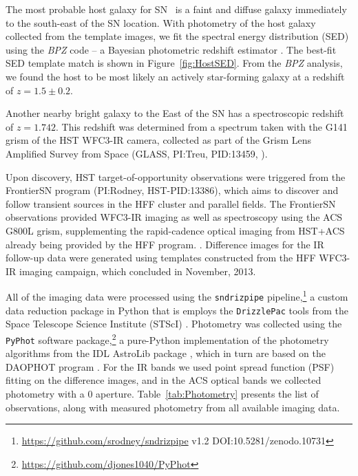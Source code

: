 The most probable host galaxy for SN \tomas\ is a faint and diffuse
galaxy immediately to the south-east of the SN location.  With
photometry of the host galaxy collected from the template images, we
fit the spectral energy distribution (SED) using the {\it BPZ} code --
a Bayesian photometric redshift estimator \citep{Benitez:2000}. The
best-fit SED template match is shown in Figure~\ref{fig:HostSED}.
From the {\it BPZ} analysis, we found the host to be most likely an
actively star-forming galaxy at a redshift of $z=1.5\pm0.2$.  

Another nearby bright galaxy to the East of the SN has a spectroscopic
redshift of $z=1.742$.  This redshift was determined from a spectrum
taken with the G141 grism of the HST WFC3-IR camera, collected as part
of the Grism Lens Amplified Survey from Space (GLASS, PI:Treu,
PID:13459, \citealt{Treu:2015}). 

Upon discovery, HST target-of-opportunity observations were triggered
from the FrontierSN program (PI:Rodney, HST-PID:13386), which aims to
discover and follow transient sources in the HFF cluster and parallel
fields. The FrontierSN observations provided WFC3-IR imaging as well
as spectroscopy using the ACS G800L grism, supplementing the
rapid-cadence optical imaging from HST+ACS already being provided by
the HFF program. .
Difference images for the IR follow-up data were generated using
templates constructed from the HFF WFC3-IR imaging campaign, which
concluded in November, 2013.

All of the imaging data were processed using the {\tt sndrizpipe}
pipeline,\footnote{\url{https://github.com/srodney/sndrizpipe} v1.2
DOI:10.5281/zenodo.10731} a custom data reduction package in Python
that is employs the {\tt DrizzlePac} tools from the Space Telescope
Science Institute (STScI) \citep{Fruchter:2010}.  Photometry was
collected using the {\tt PyPhot} software
package,\footnote{\url{https://github.com/djones1040/PyPhot}} a
pure-Python implementation of the photometry algorithms from the IDL
AstroLib package \citep{Landsman:1993}, which in turn are based on the
DAOPHOT program \citep{Stetson:1987}.  For the IR bands we used point
spread function (PSF) fitting on the difference images, and in the ACS
optical bands we collected photometry with a
0 aperture. Table~\ref{tab:Photometry} presents the list of
observations, along with measured photometry from all available
imaging data.
 


